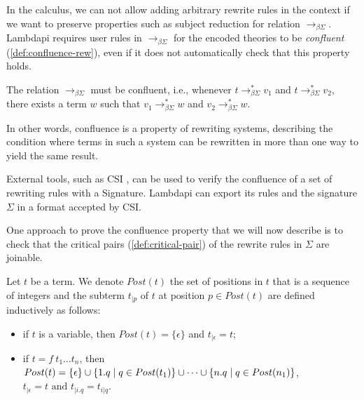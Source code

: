 In the \lpm calculus, we can not allow adding arbitrary rewrite rules in the context if
we want to preserve properties such as subject reduction for relation $\longrightarrow_{\beta\Sigma}$.
Lambdapi requires user rules in $\longrightarrow_{\beta\Sigma}$ for the encoded theories to be \emph{confluent} (\cref{def:confluence-rew}),
even if it does not automatically check that this property holds.

\begin{definition}\label{def:confluence-rew}
The relation $\longrightarrow_{\beta\Sigma}$ must be confluent, i.e., whenever $t \longrightarrow_{\beta\Sigma}^* v_1$ and $t \longrightarrow_{\beta\Sigma}^* v_2$, there exists a term $w$ such that $v_1 \longrightarrow_{\beta\Sigma}^* w$ and $v_2 \longrightarrow_{\beta\Sigma}^* w$.

\begin{center}
\end{center}
\end{definition}

In other words, confluence is a property of rewriting systems, describing the condition where terms in such a system can be rewritten in more than one way to yield the same result.

\begin{remark}
External tools, such as CSI \cite{CSI}, can be used to verify the confluence of a set of rewriting rules with a Signature.
Lambdapi can export its rules and the signature $\Sigma$ in a format accepted by CSI.
\end{remark}

One approach to prove the confluence property that we will now describe is to check that the critical pairs (\cref{def:critical-pair}) of the rewrite rules in $\Sigma$ are joinable.

\begin{definition}
Let $t$ be a term. We denote $Post(t)$ the set of positions in $t$ that is a sequence of integers and the subterm $t_{| p}$ of $t$
at position $p \in Post(t)$ are defined inductively as follows:
\begin{itemize}
  \item if $t$ is a variable, then $Post(t) = \{ \epsilon \}$ and $t_{| \epsilon} = t$;
  \item if $t = f~t_1 \dots t_n$, then \( Post(t) = \{ \epsilon \} \cup \{1.q \mathrel{|} q \in Post(t_1)\} \cup \dots \cup \{n.q \mathrel{|} q \in Post(n_1)\} \),
    \( t_{| \epsilon} = t \text{ and } t_{| i.q} = t_{i|q} \).

\end{itemize}
\end{definition}

